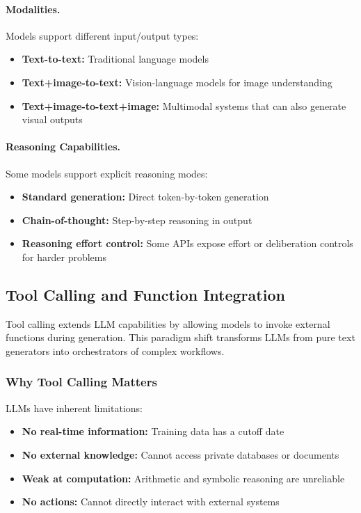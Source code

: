 \documentclass[class=article,crop=false]{standalone}
\begin{document}
\paragraph{Modalities.} Models support different input/output types:
\begin{itemize}
  \item \textbf{Text-to-text:} Traditional language models
  \item \textbf{Text+image-to-text:} Vision-language models for image understanding
  \item \textbf{Text+image-to-text+image:} Multimodal systems that can also generate visual outputs
\end{itemize}

\paragraph{Reasoning Capabilities.} Some models support explicit reasoning modes:
\begin{itemize}
  \item \textbf{Standard generation:} Direct token-by-token generation
  \item \textbf{Chain-of-thought:} Step-by-step reasoning in output
  \item \textbf{Reasoning effort control:} Some APIs expose effort or deliberation controls for harder problems
\end{itemize}

\subsection{Tool Calling and Function Integration}
\label{sec:inference:tools}

Tool calling extends LLM capabilities by allowing models to invoke external functions during generation. This paradigm shift transforms LLMs from pure text generators into orchestrators of complex workflows.

\subsubsection{Why Tool Calling Matters}

LLMs have inherent limitations:
\begin{itemize}
  \item \textbf{No real-time information:} Training data has a cutoff date
  \item \textbf{No external knowledge:} Cannot access private databases or documents
  \item \textbf{Weak at computation:} Arithmetic and symbolic reasoning are unreliable
  \item \textbf{No actions:} Cannot directly interact with external systems
\end{itemize}
\end{document}

